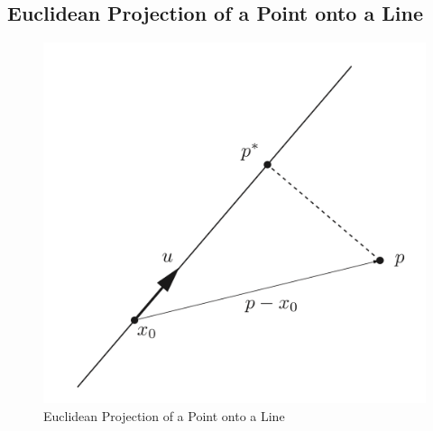\documentclass[12pt]{article}
\begin{document}
\subsection{Euclidean Projection of a Point onto a Line}
\begin{figure}[h!]\begin{center}\includegraphics[scale=0.24]{figures/proj3}\caption{Euclidean Projection of a Point onto a Line}\end{center}\end{figure}
\end{document}
